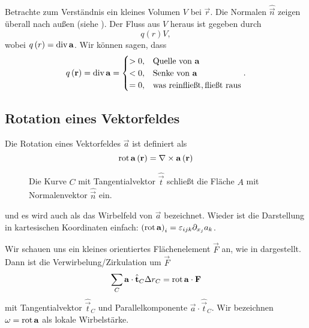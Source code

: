 Betrachte zum Verständnis ein kleines Volumen $ V$ bei $\vec {r}$. Die Normalen $\hat{\vec {n }}$ zeigen überall nach außen (siehe ).
Der Fluss aus $V$ heraus ist gegeben durch
\begin{equation*}
	q\left(r\right) V,
\end{equation*}
wobei $q\left(r\right)=\operatorname{div} \mathbf{a}$. Wir können sagen, dass
\begin{align*}
	q\left(\mathbf{r}\right)=\operatorname{div} \mathbf{a}=\begin{cases} >0, & \text{Quelle von }\mathbf{a}                       \\
              <0, & \text{Senke von }\mathbf{a}                        \\
              =0, & \text{was reinflie\ss{}t},\text{flie\ss{}t raus}
	                                      \end{cases} .
\end{align*}



\subsection{Rotation eines Vektorfeldes}

Die Rotation eines Vektorfeldes $\vec {a}$ ist definiert als
\begin{equation*}
	\operatorname{rot} \mathbf{a}\left(\mathbf{r}\right)=\nabla \times \mathbf{a}\left(\mathbf{r}\right)
\end{equation*}


\begin{figure}[htb]
	\centering
	\tfigSurfaceWithCurveAndNormal
	\caption{Die Kurve $C$ mit Tangentialvektor $\hat{\vec{t}}$ schließt die Fläche $A$ mit Normalenvektor $\hat{\vec{n}}$ ein. }
	\label{fig:area_with_curve_normal}
\end{figure}

und es wird auch als das Wirbelfeld von $\vec {a}$ bezeichnet. Wieder ist die Darstellung in kartesischen Koordinaten einfach: $\left(\operatorname{rot} \mathbf{a}\right)_{i}=\varepsilon _{ijk}\partial _{{x_{j}}}a_{k}$.

Wir schauen uns ein kleines orientiertes Flächenelement $\vec F$ an, wie in  dargestellt. Dann ist die Verwirbelung/Zirkulation um $\vec F$
\begin{equation*}
	\sum _{C}\mathbf{a}\cdot \hat{\mathbf{t}}_{C}\Delta  r_{C}=\operatorname{rot} \mathbf{a}\cdot  \mathbf{F}
\end{equation*}
mit Tangentialvektor $\hat{\vec {t}}_{C}$ und Parallelkomponente $\vec {a}\cdot \hat{\vec {t}}_{C}$. Wir bezeichnen $\mathbf{\omega }=\operatorname{rot} \mathbf{a}$ als lokale Wirbelstärke.

